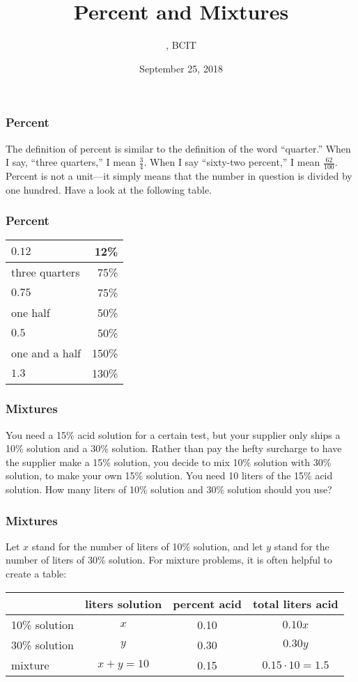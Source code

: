 \documentclass[xcolor=dvipsnames]{beamer}
\title{Percent and Mixtures}
\subtitle{{\CourseNumber}, BCIT}
\author{\CourseName}
\date{September 25, 2018}
\begin{document}
\begin{frame}
  \titlepage
\end{frame}

\begin{frame}
  \frametitle{Percent}
The definition of percent is similar to the definition of the word
``quarter.'' When I say, ``three quarters,'' I mean $\frac{3}{4}$.
When I say ``sixty-two percent,'' I mean $\frac{62}{100}$. Percent is
not a unit---it simply means that the number in question is divided by
one hundred. Have a look at the following table.
\end{frame}

\begin{frame}
  \frametitle{Percent}
\begin{tabular}{|l|r|}\hline
  $0.12$ & 12\% \\ \hline
  three quarters & 75\% \\ \hline
  $0.75$ & 75\% \\ \hline
  one half & 50\% \\ \hline
  $0.5$ & 50\% \\ \hline
  one and a half & 150\% \\ \hline
  $1.3$ & 130\% \\ \hline
\end{tabular}
\end{frame}

\begin{frame}
  \frametitle{Mixtures}
  You need a 15\% acid solution for a certain test, but your supplier
  only ships a 10\% solution and a 30\% solution. Rather than pay the
  hefty surcharge to have the supplier make a 15\% solution, you
  decide to mix 10\% solution with 30\% solution, to make your own
  15\% solution. You need 10 liters of the 15\% acid solution. How
  many liters of 10\% solution and 30\% solution should you use?
\end{frame}

\begin{frame}
  \frametitle{Mixtures}
  Let $x$ stand for the number of liters of 10\% solution, and let $y$
  stand for the number of liters of 30\% solution. For mixture
  problems, it is often helpful to create a table:

  \bigskip

  \begin{tabular}{|l|c|c|c|}\hline
    & liters solution & percent acid & total liters acid \\ \hline
    10\% solution & $x$ & 0.10 & $0.10x$ \\ \hline
    30\% solution & $y$ & 0.30 & $0.30y$ \\ \hline
    mixture & $x+y=10$ & 0.15 & $0.15\cdot{}10=1.5$ \\ \hline
  \end{tabular}
\end{frame}
\end{document}
